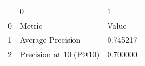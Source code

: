 \begin{tabular}{lll}
 & 0 & 1 \\
0 & Metric & Value \\
1 & Average Precision & 0.745217 \\
2 & Precision at 10 (P@10) & 0.700000 \\
\end{tabular}
